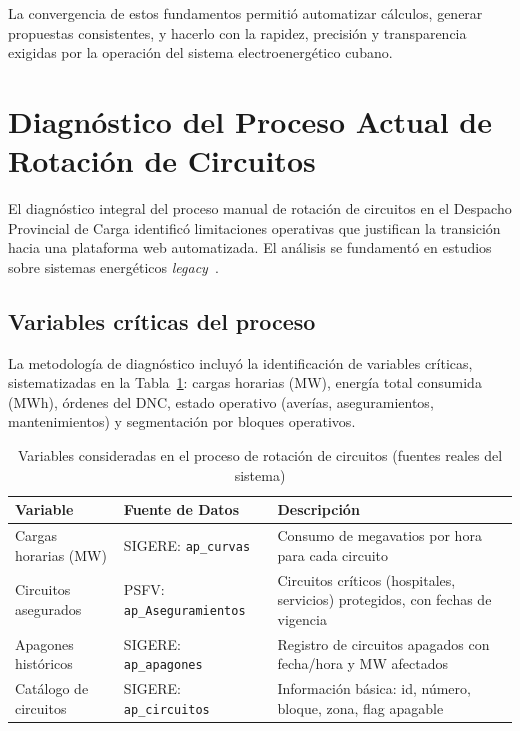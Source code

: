 La convergencia de estos fundamentos permitió automatizar cálculos, generar propuestas consistentes, y hacerlo con la rapidez, precisión y transparencia exigidas por la operación del sistema electroenergético cubano.

\section{Diagnóstico del Proceso Actual de Rotación de Circuitos}

El diagnóstico integral del proceso manual de rotación de circuitos en el Despacho Provincial de Carga identificó limitaciones operativas que justifican la transición hacia una plataforma web automatizada. El análisis se fundamentó en estudios sobre sistemas energéticos \textit{legacy}~\citep{villalba2021}.

\subsection{Variables críticas del proceso}
La metodología de diagnóstico incluyó la identificación de variables críticas, sistematizadas en la Tabla~\ref{tab:variables_rotacion}: cargas horarias (MW), energía total consumida (MWh), órdenes del DNC, estado operativo (averías, aseguramientos, mantenimientos) y segmentación por bloques operativos.

\begin{table}[H]
\centering
\small
\begin{tabular}{|p{3cm}|p{3.2cm}|p{7.5cm}|}
\hline
\textbf{Variable} & \textbf{Fuente de Datos} & \textbf{Descripción} \\
\hline
Cargas horarias (MW) & SIGERE: \texttt{ap\_curvas} & Consumo de megavatios por hora para cada circuito \\
\hline
Circuitos asegurados & PSFV: \texttt{ap\_Aseguramientos} & Circuitos críticos (hospitales, servicios) protegidos, con fechas de vigencia \\ \hline
Apagones históricos & SIGERE: \texttt{ap\_apagones} & Registro de circuitos apagados con fecha/hora y MW afectados \\ \hline
Catálogo de circuitos & SIGERE: \texttt{ap\_circuitos} & Información básica: id, número, bloque, zona, flag apagable \\ \hline
\end{tabular}
\caption{Variables consideradas en el proceso de rotación de circuitos (fuentes reales del sistema)}
\label{tab:variables_rotacion}
\end{table}


